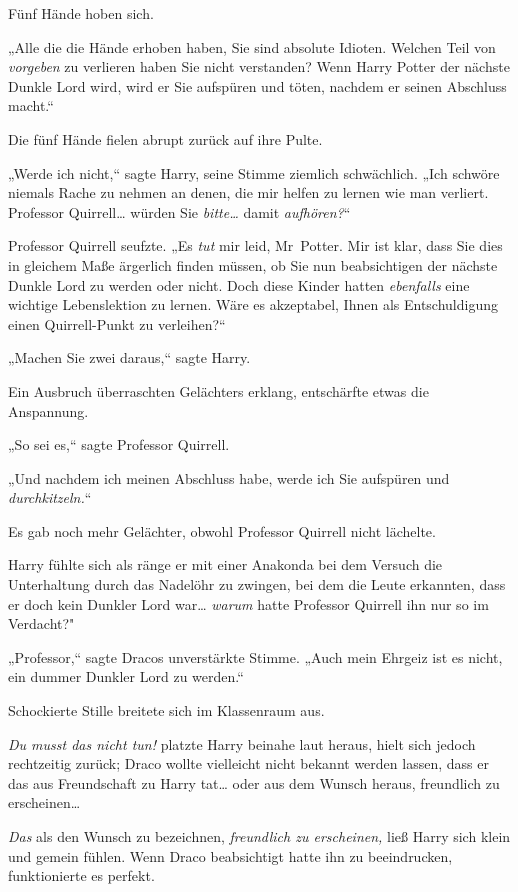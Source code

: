 {Fünf Hände hoben sich.

„Alle die die Hände erhoben haben, Sie sind absolute Idioten. Welchen Teil von \emph{vorgeben} zu verlieren haben Sie nicht verstanden? Wenn Harry Potter der nächste Dunkle Lord wird, wird er Sie aufspüren und töten, nachdem er seinen Abschluss macht.“

Die fünf Hände fielen abrupt zurück auf ihre Pulte.

„Werde ich nicht,“ sagte Harry, seine Stimme ziemlich schwächlich. „Ich schwöre niemals Rache zu nehmen an denen, die mir helfen zu lernen wie man verliert. Professor Quirrell… würden Sie \emph{bitte…} damit \emph{aufhören?}“

Professor Quirrell seufzte. „Es \emph{tut} mir leid, Mr~Potter. Mir ist klar, dass Sie dies in gleichem Maße ärgerlich finden müssen, ob Sie nun beabsichtigen der nächste Dunkle Lord zu werden oder nicht. Doch diese Kinder hatten \emph{ebenfalls} eine wichtige Lebenslektion zu lernen. Wäre es akzeptabel, Ihnen als Entschuldigung einen Quirrell-Punkt zu verleihen?“

„Machen Sie zwei daraus,“ sagte Harry.

Ein Ausbruch überraschten Gelächters erklang, entschärfte etwas die Anspannung.

„So sei es,“ sagte Professor Quirrell.

„Und nachdem ich meinen Abschluss habe, werde ich Sie aufspüren und \emph{durchkitzeln.}“

Es gab noch mehr Gelächter, obwohl Professor Quirrell nicht lächelte.

Harry fühlte sich als ränge er mit einer Anakonda bei dem Versuch die Unterhaltung durch das Nadelöhr zu zwingen, bei dem die Leute erkannten, dass er doch kein Dunkler Lord war… \emph{warum} hatte Professor Quirrell ihn nur so im Verdacht?"

„Professor,“ sagte Dracos unverstärkte Stimme. „Auch mein Ehrgeiz ist es nicht, ein dummer Dunkler Lord zu werden.“

Schockierte Stille breitete sich im Klassenraum aus.

\emph{Du musst das nicht tun!} platzte Harry beinahe laut heraus, hielt sich jedoch rechtzeitig zurück; Draco wollte vielleicht nicht bekannt werden lassen, dass er das aus Freundschaft zu Harry tat… oder aus dem Wunsch heraus, freundlich zu erscheinen…

\emph{Das} als den Wunsch zu bezeichnen, \emph{freundlich zu erscheinen,} ließ Harry sich klein und gemein fühlen. Wenn Draco beabsichtigt hatte ihn zu beeindrucken, funktionierte es perfekt.

}
